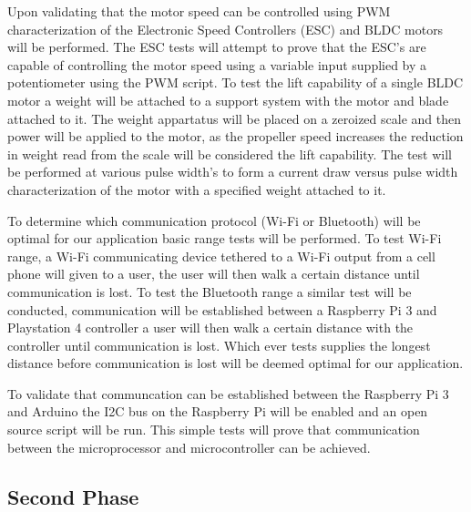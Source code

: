 Upon validating that the motor speed can be controlled using PWM characterization of the Electronic Speed Controllers (ESC) and BLDC motors will be performed. The ESC tests will attempt to prove that the ESC's are capable of controlling the motor speed using a variable input supplied by a potentiometer using the PWM script. To test the lift capability of a single BLDC motor a weight will be attached to a support system with the motor and blade attached to it. The weight appartatus will be placed on a zeroized scale and then power will be applied to the motor, as the propeller speed increases the reduction in weight read from the scale will be considered the lift capability. The test will be performed at various pulse width's to form a current draw versus pulse width characterization of the motor with a specified weight attached to it. 

To determine which communication protocol (Wi-Fi or Bluetooth) will be optimal for our application basic range tests will be performed. To test Wi-Fi range, a Wi-Fi communicating device tethered to a Wi-Fi output from a cell phone will given to a user, the user will then walk a certain distance until communication is lost. To test the Bluetooth range a similar test will be conducted, communication will be established between a Raspberry Pi 3 and Playstation 4 controller a user will then walk a certain distance with the controller until communication is lost. Which ever tests supplies the longest distance before communication is lost will be deemed optimal for our application.

To validate that communcation can be established between the Raspberry Pi 3 and Arduino the I2C bus on the Raspberry Pi will be enabled and an open source script will be run. This simple tests will prove that communication between the microprocessor and microcontroller can be achieved.

\subsection{Second Phase}

